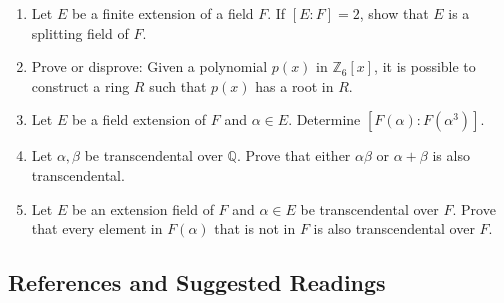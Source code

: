 {\begin{enumerate}
\item
Let $E$ be a finite extension of a field $F$. If $[E:F]=2$, show that
$E$ is a splitting field of $F$.


\item
Prove or disprove: Given a polynomial $p(x)$ in ${\mathbb Z}_6[x]$, it is
possible to construct a ring $R$ such that $p(x)$ has a root in
$R$. 


\item
Let $E$ be a field extension of $F$ and $\alpha \in E$.  Determine
$[F(\alpha): F(\alpha^3)]$.


\item
Let $\alpha, \beta$ be transcendental over ${\mathbb Q}$. Prove that
either $\alpha \beta$ or $\alpha + \beta$ is also transcendental.


\item
Let $E$ be an extension field of $F$ and $\alpha \in E$ be
transcendental over $F$.  Prove that every element in $F(\alpha)$
that is not in $F$ is also transcendental over $F$.


\end{enumerate}
}
 
 
 
 
\subsection*{References and Suggested Readings}
 
